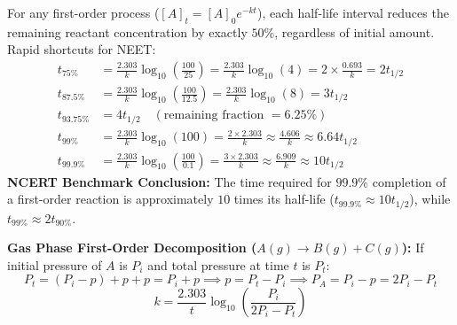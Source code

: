\documentclass[10pt,a4paper]{article}
\begin{document}
\begin{ncertbox}
For any first-order process ($[A]_t = [A]_0 e^{-kt}$), each half-life interval reduces the remaining reactant concentration by exactly $50\%$, regardless of initial amount. Rapid shortcuts for NEET:
\begin{align*}
  t_{75\%} &= \frac{2.303}{k}\log_{10}\left(\frac{100}{25}\right) = \frac{2.303}{k}\log_{10}(4) = 2 \times \frac{0.693}{k} = 2 t_{1/2} \\
  t_{87.5\%} &= \frac{2.303}{k}\log_{10}\left(\frac{100}{12.5}\right) = \frac{2.303}{k}\log_{10}(8) = 3 t_{1/2} \\
  t_{93.75\%} &= 4 t_{1/2} \quad (\text{remaining fraction } = 6.25\%) \\
  t_{99\%} &= \frac{2.303}{k}\log_{10}(100) = \frac{2 \times 2.303}{k} \approx \frac{4.606}{k} \approx 6.64 t_{1/2} \\
  t_{99.9\%} &= \frac{2.303}{k}\log_{10}\left(\frac{100}{0.1}\right) = \frac{3 \times 2.303}{k} \approx \frac{6.909}{k} \approx 10 t_{1/2}
\end{align*}
\textbf{NCERT Benchmark Conclusion:} The time required for $99.9\%$ completion of a first-order reaction is approximately $10$ times its half-life ($t_{99.9\%} \approx 10 t_{1/2}$), while $t_{99\%} \approx 2 t_{90\%}$.
\end{ncertbox}
\textbf{Gas Phase First-Order Decomposition ($A(g) \to B(g) + C(g)$):}
If initial pressure of $A$ is $P_i$ and total pressure at time $t$ is $P_t$:
\begin{equation}
  P_t = (P_i - p) + p + p = P_i + p \implies p = P_t - P_i \implies P_A = P_i - p = 2P_i - P_t
\end{equation}
\begin{equation}
  k = \frac{2.303}{t}\log_{10}\left(\frac{P_i}{2P_i - P_t}\right)
\end{equation}
\end{document}
